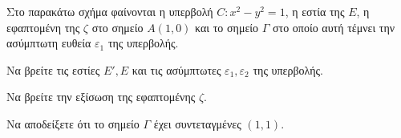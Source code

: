 Στο παρακάτω σχήμα φαίνονται η υπερβολή $C: x^2 - y^2 = 1$, η εστία της $E$, η εφαπτομένη της $\zeta$ στο σημείο $A(1,0)$ και το σημείο $\Gamma$ στο οποίο αυτή τέμνει την ασύμπτωτη ευθεία $\varepsilon_1$ της υπερβολής.
\begin{alist}
\item Να βρείτε τις εστίες $E', E$ και τις ασύμπτωτες $\varepsilon_1, \varepsilon_2$ της υπερβολής. 
\item
    \begin{rlist}
    \item Να βρείτε την εξίσωση της εφαπτομένης $\zeta$. 
    \item Να αποδείξετε ότι το σημείο $\Gamma$ έχει συντεταγμένες $(1,1)$. 
    \end{rlist}
\end{alist}